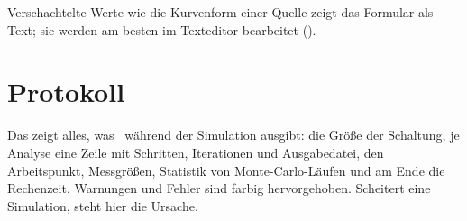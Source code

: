 Verschachtelte Werte wie die Kurvenform  einer Quelle zeigt das
Formular als Text; sie werden am besten im Texteditor bearbeitet
().

\section{Protokoll}

Das  zeigt alles, was \esim\ während der Simulation
ausgibt: die Größe der Schaltung, je Analyse eine Zeile mit Schritten,
Iterationen und Ausgabedatei, den Arbeitspunkt, Messgrößen, Statistik von
Monte-Carlo-Läufen und am Ende die Rechenzeit. Warnungen und Fehler sind
farbig hervorgehoben. Scheitert eine Simulation, steht hier die Ursache.
